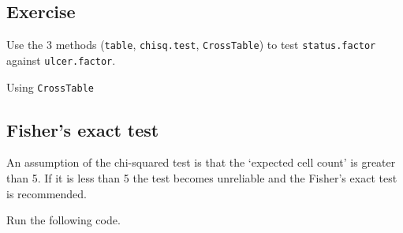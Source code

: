 \documentclass[]{book}
\makeatletter
\newenvironment{Shaded}{\begin{snugshade}}{\end{snugshade}}
\newcommand{\DataTypeTok}[1]{\textcolor[rgb]{0.13,0.29,0.53}{#1}}
\newcommand{\KeywordTok}[1]{\textcolor[rgb]{0.13,0.29,0.53}{\textbf{#1}}}
\newcommand{\NormalTok}[1]{#1}
\newcommand{\OperatorTok}[1]{\textcolor[rgb]{0.81,0.36,0.00}{\textbf{#1}}}
\newcommand{\OtherTok}[1]{\textcolor[rgb]{0.56,0.35,0.01}{#1}}
\newenvironment{kframe}{%
\medskip{}
\setlength{\fboxsep}{.8em}
 \def\at@end@of@kframe{}%
 \ifinner\ifhmode%
  \def\at@end@of@kframe{\end{minipage}}%
  \begin{minipage}{\columnwidth}%
 \fi\fi%
 \def\FrameCommand##1{\hskip\@totalleftmargin \hskip-\fboxsep
 \colorbox{shadecolor}{##1}\hskip-\fboxsep
     \hskip-\linewidth \hskip-\@totalleftmargin \hskip\columnwidth}%
 \MakeFramed {\advance\hsize-\width
   \@totalleftmargin\z@ \linewidth\hsize
   \@setminipage}}%
 {\par\unskip\endMakeFramed%
 \at@end@of@kframe}
\renewenvironment{Shaded}{\begin{kframe}}{\end{kframe}}
\theoremstyle{definition}
\theoremstyle{definition}
\theoremstyle{definition}
\theoremstyle{remark}
\makeatother
\begin{document}
\hypertarget{exercise-35}{%
\subsection{Exercise}\label{exercise-35}}

Use the 3 methods (\texttt{table}, \texttt{chisq.test},
\texttt{CrossTable}) to test \texttt{status.factor} against
\texttt{ulcer.factor}.

\begin{Shaded}
\end{Shaded}

Using \texttt{CrossTable}

\begin{Shaded}
\end{Shaded}

\hypertarget{fishers-exact-test}{%
\subsection{Fisher's exact test}\label{fishers-exact-test}}

An assumption of the chi-squared test is that the `expected cell count'
is greater than 5. If it is less than 5 the test becomes unreliable and
the Fisher's exact test is recommended.

Run the following code.

\begin{Shaded}
\end{Shaded}
\end{document}
